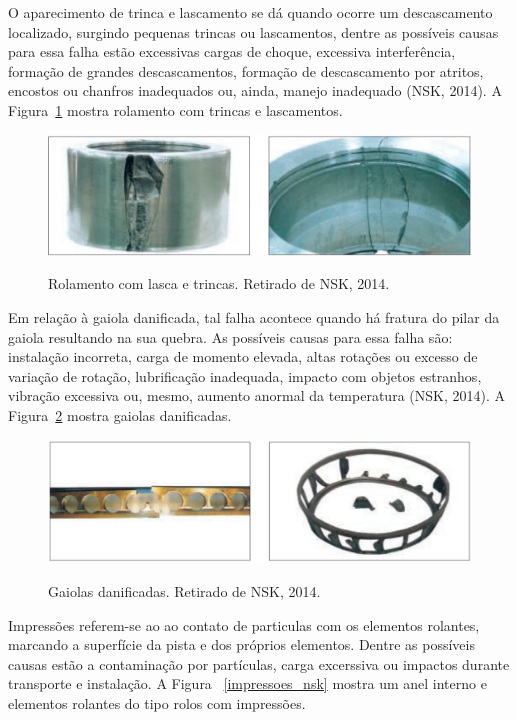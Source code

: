 \documentclass[
	12pt,				
	oneside,			
	a4paper,			
	english,			
	brazil,			
	]{abntex2ppgsi}
\begin{document}
O aparecimento de trinca e lascamento se dá quando ocorre um descascamento localizado, surgindo pequenas trincas ou lascamentos, dentre as possíveis causas para essa falha estão excessivas cargas de choque, excessiva interferência, formação de grandes descascamentos, formação de descascamento por atritos, encostos ou chanfros inadequados ou, ainda, manejo inadequado (NSK, 2014). A Figura~\ref{trinca_nsk} mostra rolamento com trincas e lascamentos. 

\begin{figure}[H]
\centering
\caption {Rolamento com lasca e trincas. Retirado de NSK, 2014.}
\includegraphics[width=\textwidth,height=\textheight,keepaspectratio]{trinca_nsk}
\label{trinca_nsk}
\end{figure}

Em relação à gaiola danificada, tal falha acontece quando há fratura do pilar da gaiola resultando na sua quebra. As possíveis causas para essa falha são: instalação incorreta, carga de momento elevada, altas rotações ou excesso de variação de rotação, lubrificação inadequada, impacto com objetos estranhos, vibração excessiva ou, mesmo, aumento anormal da temperatura (NSK, 2014). A Figura~\ref{gaiola_nsk} mostra gaiolas danificadas. 

\begin{figure}[H]
\centering
\caption {Gaiolas danificadas. Retirado de NSK, 2014.}
\includegraphics[width=\textwidth,height=\textheight,keepaspectratio]{gaiola_nsk}
\label{gaiola_nsk}
\end{figure}

Impressões referem-se ao ao contato de particulas com os elementos rolantes, marcando a superfície da pista e dos próprios elementos. Dentre as possíveis causas estão a contaminação por partículas, carga excerssiva ou impactos durante transporte e instalação. A Figura ~\ref{impressoes_nsk} mostra um anel interno e elementos rolantes do tipo rolos com impressões. 
\end{document}
